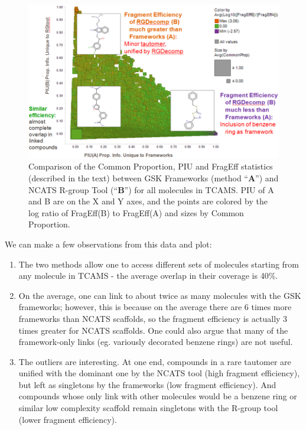 \documentclass[journal=jacsat,manuscript=article]{achemso}
\begin{document}
\begin{figure}
\includegraphics[width=6in]{fig/statcompare_frames_RGtool.png}
\caption{Comparison of the Common Proportion, PIU and FragEff statistics (described in the text) between GSK Frameworks (method ``{\bf A}'') and NCATS R-group Tool (``{\bf B}'') for all molecules in TCAMS. PIU of A and B are on the X and Y axes, and the points are colored by the log ratio of FragEff(B) to FragEff(A) and sizes by Common Proportion.}
\label{fig:statcompare}
\end{figure}
 
We can make a few observations from this data and plot:
\begin{enumerate} 
\item The two methods allow one to access different sets of molecules starting from any molecule in TCAMS - the average overlap in their coverage is 40\%.
\item On the average, one can link to about twice as many molecules with the GSK frameworks; however, this is because on the average there are 6 times more frameworks than NCATS scaffolds, so the fragment efficiency is actually 3 times greater for NCATS scaffolds. One could also argue that many of the framework-only links (eg. variously decorated benzene rings) are not useful.
\item The outliers are interesting. At one end, compounds in a rare tautomer are unified with the dominant one by the NCATS tool (high fragment efficiency), but left as singletons by the frameworks (low fragment efficiency). And compounds whose only link with other molecules would be a benzene ring or similar low complexity scaffold remain singletons with the R-group tool (lower fragment efficiency).
\end{enumerate}
\end{document}
